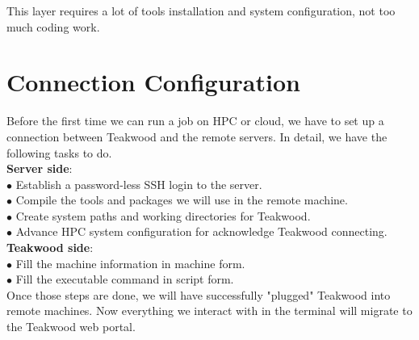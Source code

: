 This layer requires a lot of tools installation and system configuration, not too much coding work.

\section{Connection Configuration}
Before the first time we can run a job on HPC or cloud, we have to set up a connection between Teakwood and the remote servers. In detail, we have the following tasks to do.\\

\textbf{Server side}:\\
$\bullet$ Establish a password-less SSH login to the server.\\
$\bullet$ Compile the tools and packages we will use in the remote machine.\\
$\bullet$ Create system paths and working directories for Teakwood.\\
$\bullet$ Advance HPC system configuration for acknowledge Teakwood connecting.\\

\textbf{Teakwood side}:\\
$\bullet$ Fill the machine information in machine form.\\
$\bullet$ Fill the executable command in script form.\\

Once those steps are done, we will have successfully "plugged" Teakwood into remote machines. Now everything we interact with  in the terminal will migrate to the Teakwood web portal.






